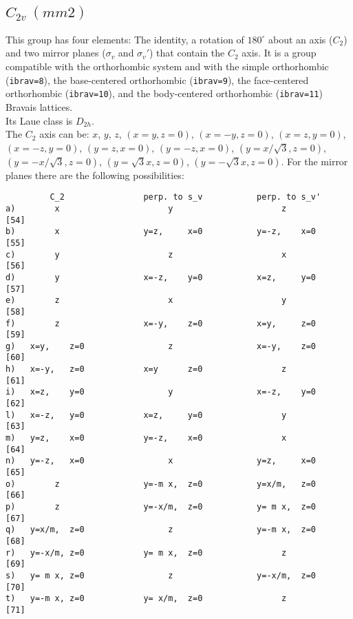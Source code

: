 \documentclass[12pt,a4paper]{article}
\begin{document}
\subsection{\color{web-blue}$C_{2v}\ (mm2)$} 
This group has four elements: The identity, a rotation of $180^\circ$ about
an axis ($C_2$) and two mirror planes ($\sigma_v$ and $\sigma_v'$) that contain 
the $C_2$ axis.
It is a group compatible with the orthorhombic system and with the
simple orthorhombic (\texttt{ibrav=8}), the base-centered
orthorhombic (\texttt{ibrav=9}), the face-centered orthorhombic 
(\texttt{ibrav=10}), and the body-centered orthorhombic (\texttt{ibrav=11}) 
Bravais lattices.\\
Its Laue class is $D_{2h}$. \\
The $C_2$ axis can be:
$x$, $y$, $z$, $(x=y, z=0)$, $(x=-y, z=0)$, $(x=z, y=0)$, $(x=-z, y=0)$,
$(y=z, x=0)$, $(y=-z, x=0)$, $(y=x/\sqrt{3}, z=0)$, $(y=-x/\sqrt{3}, z=0)$, 
$(y=\sqrt{3}x, z=0)$, $(y=-\sqrt{3}x, z=0)$. For the mirror planes there are
the following possibilities:
\begin{footnotesize}
\begin{verbatim}
         C_2                perp. to s_v           perp. to s_v'
a)        x                      y                      z          [54]
b)        x                 y=z,     x=0           y=-z,    x=0    [55]
c)        y                      z                      x          [56]
d)        y                 x=-z,    y=0           x=z,     y=0    [57]
e)        z                      x                      y          [58]    
f)        z                 x=-y,    z=0           x=y,     z=0    [59]
g)   x=y,    z=0                 z                 x=-y,    z=0    [60]
h)   x=-y,   z=0            x=y      z=0                z          [61] 
i)   x=z,    y=0                 y                 x=-z,    y=0    [62] 
l)   x=-z,   y=0            x=z,     y=0                y          [63]
m)   y=z,    x=0            y=-z,    x=0                x          [64]
n)   y=-z,   x=0                 x                 y=z,     x=0    [65]
o)        z                 y=-m x,  z=0           y=x/m,   z=0    [66] 
p)        z                 y=-x/m,  z=0           y= m x,  z=0    [67] 
q)   y=x/m,  z=0                 z                 y=-m x,  z=0    [68]
r)   y=-x/m, z=0            y= m x,  z=0                z          [69]
s)   y= m x, z=0                 z                 y=-x/m,  z=0    [70]
t)   y=-m x, z=0            y= x/m,  z=0                z          [71]
\end{verbatim}
\end{footnotesize}
\end{document}
